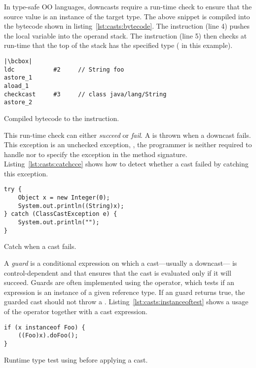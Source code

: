 In type-safe OO languages, downcasts require
a run-time check to ensure that the source value is an instance of the target type.
The above snippet is compiled into the \java{} bytecode shown in listing~\ref{lst:casts:bytecode}.
The  instruction (line 4) pushes the local variable  into the operand stack.
The  instruction (line 5) then checks at run-time that the top of the stack has the specified type ( in this example).

\begin{listing}
\begin{verbatim}
|\bcbox|
ldc           #2     // String foo 
astore_1
aload_1
checkcast     #3     // class java/lang/String
astore_2
\end{verbatim}	
\caption{Compiled bytecode to the  instruction.}
\label{lst:casts:bytecode}
\end{listing}

This run-time check can either \emph{succeed} or \emph{fail}.
A  is thrown when a downcast fails.
This exception is an unchecked exception, \ie{},
the programmer is neither required to handle nor to specify the exception in the method signature.
Listing~\ref{lst:casts:catchcce} shows how to detect whether a cast failed by catching this exception.

\begin{listing}
\begin{verbatim}	
try {
	Object x = new Integer(0);
	System.out.println((String)x); 
} catch (ClassCastException e) { 
	System.out.println(""); 
}
\end{verbatim}
\caption{Catch  when a cast fails.}
\label{lst:casts:catchcce}
\end{listing}

A \emph{guard} is a conditional expression on which a cast---usually a downcast--- is control-dependent and that ensures that the cast is evaluated only if it will succeed.
Guards are often implemented using the  operator, which tests
if an expression is an instance of a given reference type.
If an  guard returns true, the guarded cast should not throw
a .
Listing~\ref{lst:casts:instanceoftest} shows a usage of the  operator together with a cast expression.

\begin{listing}
\begin{verbatim}
if (x instanceof Foo) {
	((Foo)x).doFoo();
}
\end{verbatim}
\caption{Runtime type test using  before applying a cast.}
\label{lst:casts:instanceoftest}
\end{listing}

